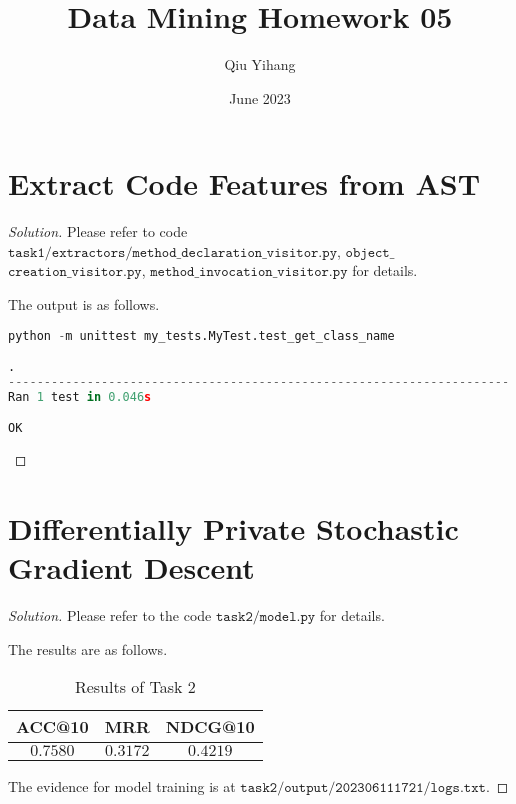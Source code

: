 \documentclass{article}
\title{\textbf{Data Mining Homework 05}}
\author{Qiu Yihang}
\date{June 2023}
\newenvironment{solution}{\begin{proof}[\noindent\it Solution]}{\end{proof}}
\begin{document}
\maketitle

\vspace{1em}
\section{Extract Code Features from AST}
\vspace{0.5em}
\begin{solution}
    Please refer to code $\mathtt{task1/extractors/method\_declaration\_visitor.py}$, $\mathtt{object\_}$ $\mathtt{creation\_visitor.py}$, $\mathtt{method\_invocation\_visitor.py}$ for details.

    \hspace{2.2em}
    The output is as follows.

\begin{lstlisting}[language=python]
python -m unittest my_tests.MyTest.test_get_class_name

.
----------------------------------------------------------------------
Ran 1 test in 0.046s

OK
\end{lstlisting}

\vspace{-2.5em}
\end{solution}

\vspace{0.5em}
\section{Differentially Private Stochastic Gradient Descent}
\vspace{0.5em}
\begin{solution}
    Please refer to the code $\mathtt{task2/model.py}$ for details.

    \hspace{2.2em}
    The results are as follows.


    \begin{table}[htbp]
        \centering
        \begin{tabular}{ccc}
            \toprule
            ACC@10 & MRR & NDCG@10 \\
            \midrule
            $0.7580$ & $0.3172$ & $0.4219$ \\ 
            \bottomrule
        \end{tabular}
        \caption{Results of Task 2}
        \label{results}
    \end{table}

    \hspace{2.2em}
    The evidence for model training is at $\mathtt{task2/output/202306111721/logs.txt}$.

\end{solution}
\end{document}

